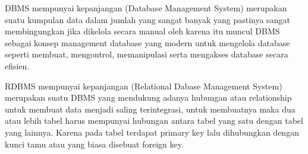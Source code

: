 \documentclass[a4paper,12 pt]{article}
\begin{document}
\begin{flushleft}
\title{\textbf{3. Penjelasan DBMS dan RDBMS}\linebreak 
\end{flushleft}
\par DBMS mempunyai kepanjangan (Database Management System) merupakan suatu kumpulan data dalam jumlah yang sangat banyak yang pastinya sangat membingungkan jika dikelola secara manual oleh karena itu muncul DBMS sebagai konsep management database yang modern untuk mengelola database seperti membuat, mengontrol, memanipulasi serta mengakses database secara efisien. 
\par RDBMS mempunyai kepanjangan (Relational Dabase Management System) merupakan suatu DBMS yang mendukung adanya hubungan atau relationship untuk membuat data menjadi saling terintegrasi, untuk membuatnya maka dua atau lebih tabel harus mempunyai hubungan antara tabel yang satu dengan tabel yang lainnya. Karena pada tabel terdapat primary key lalu dihubungkan dengan kunci tamu atau yang biasa disebuat foreign key.  
\end{document}
